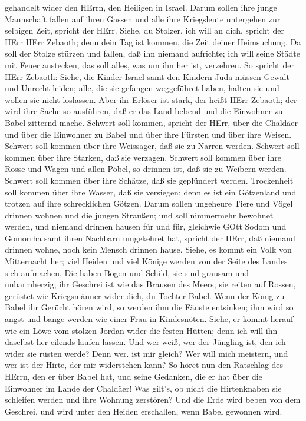 gehandelt wider den HErrn, den Heiligen in Israel.  Darum
sollen ihre junge Mannschaft fallen auf ihren Gassen und alle ihre
Kriegsleute untergehen zur selbigen Zeit, spricht der HErr.
 Siehe, du Stolzer, ich will an dich, spricht der HErr HErr
Zebaoth; denn dein Tag ist kommen, die Zeit deiner Heimsuchung.
 Da soll der Stolze stürzen und fallen, daß ihn niemand
aufrichte; ich will seine Städte mit Feuer anstecken, das soll alles,
was um ihn her ist, verzehren.  So spricht der HErr
Zebaoth: Siehe, die Kinder Israel samt den Kindern Juda müssen Gewalt
und Unrecht leiden; alle, die sie gefangen weggeführet haben, halten sie
und wollen sie nicht loslassen.  Aber ihr Erlöser ist
stark, der heißt HErr Zebaoth; der wird ihre Sache so ausführen, daß er
das Land bebend und die Einwohner zu Babel zitternd mache. 
Schwert soll kommen, spricht der HErr, über die Chaldäer und über die
Einwohner zu Babel und über ihre Fürsten und über ihre Weisen.
 Schwert soll kommen über ihre Weissager, daß sie zu Narren
werden. Schwert soll kommen über ihre Starken, daß sie verzagen.
 Schwert soll kommen über ihre Rosse und Wagen und allen
Pöbel, so drinnen ist, daß sie zu Weibern werden. Schwert soll kommen
über ihre Schätze, daß sie geplündert werden.  Trockenheit
soll kommen über ihre Wasser, daß sie versiegen; denn es ist ein
Götzenland und trotzen auf ihre schrecklichen Götzen. 
Darum sollen ungeheure Tiere und Vögel drinnen wohnen und die jungen
Straußen; und soll nimmermehr bewohnet werden, und niemand drinnen
hausen für und für,  gleichwie GOtt Sodom und Gomorrha samt
ihren Nachbarn umgekehret hat, spricht der HErr, daß niemand drinnen
wohne, noch kein Mensch drinnen hause.  Siehe, es kommt ein
Volk von Mitternacht her; viel Heiden und viel Könige werden von der
Seite des Landes sich aufmachen.  Die haben Bogen und
Schild, sie sind grausam und unbarmherzig; ihr Geschrei ist wie das
Brausen des Meers; sie reiten auf Rossen, gerüstet wie Kriegsmänner
wider dich, du Tochter Babel.  Wenn der König zu Babel ihr
Gerücht hören wird, so werden ihm die Fäuste entsinken; ihm wird so
angst und bange werden wie einer Frau in Kindesnöten. 
Siehe, er kommt herauf wie ein Löwe vom stolzen Jordan wider die festen
Hütten; denn ich will ihn daselbst her eilends laufen lassen. Und wer
weiß, wer der Jüngling ist, den ich wider sie rüsten werde? Denn wer.
ist mir gleich? Wer will mich meistern, und wer ist der Hirte, der mir
widerstehen kann?  So höret nun den Ratschlag des HErrn,
den er über Babel hat, und seine Gedanken, die er hat über die Einwohner
im Lande der Chaldäer! Was gilt's, ob nicht die Hirtenknaben sie
schleifen werden und ihre Wohnung zerstören?  Und die Erde
wird beben von dem Geschrei, und wird unter den Heiden erschallen, wenn
Babel gewonnen wird.

